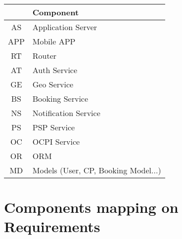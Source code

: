 \begin{tabular}{|c|l|}
	\hline
	\bf{} & \bf{Component} \\
	\hline
	\hline
	AS & Application Server\\
	\hline
	APP & Mobile APP\\
	\hline
	RT & Router\\
	\hline
	AT & Auth Service\\
	\hline
	GE & Geo Service\\
	\hline
	BS & Booking Service\\
	\hline
	NS & Notification Service\\
	\hline
	PS & PSP Service\\
	\hline
	OC & OCPI Service\\
	\hline
	OR & ORM\\
	\hline
	MD & Models (User, CP, Booking Model...)\\
	\hline
\end{tabular}

\section{Components mapping on Requirements}

